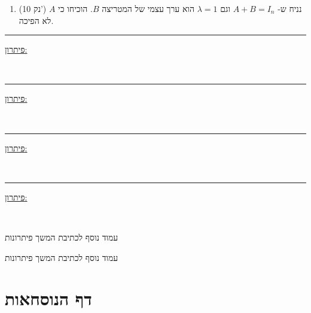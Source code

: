 \documentclass[12pt, a4paper]{article}
\newcommand{\points}[1]{(#1 נק') }
\begin{document}
\begin{enumerate}
{\begin{enumerate}
        הראו כי אם הוקטורים
        $v_1,v_2,v_3$ בלתי תלויים לינארית (בת"ל) ואם המטריצה $A$ היא הפיכה,
        
        אז
        הוקטורים
        $Av_1,Av_2,Av_3$
        הם בלתי תלויים לינארית.

        \ 
        
        \item\points{10} 
        נניח ש-
        $A+B = I_n$ וגם
        $\lambda=1$
        הוא ערך עצמי של המטריצה
        $B$.
        הוכיחו כי $A$ לא הפיכה.
    \end{enumerate}
}\forthQ
\pagebreak
\setcounter{enumi}{0}
    \firstQ
\noindent\rule{\textwidth-30pt}{0.4pt}
\underline{פיתרון:}
    
    \pagebreak \ 
    \ 
    
    \pagebreak

    
    \secondQ
    \noindent\rule{\textwidth-30pt}{0.4pt}
    \underline{פיתרון:}


    \pagebreak \ \pagebreak

    \thirdQ
    \noindent\rule{\textwidth-30pt}{0.4pt}
    \underline{פיתרון:}


    \pagebreak \ \pagebreak

    \forthQ
    \noindent\rule{\textwidth-30pt}{0.4pt}
    \underline{פיתרון:}


    \pagebreak \ \pagebreak
\end{enumerate}

    \pagebreak 
    
    עמוד נוסף לכתיבת המשך פיתרונות
    
    \pagebreak
    עמוד נוסף לכתיבת המשך פיתרונות

 \pagebreak


\section*{דף הנוסחאות}
\end{document}
